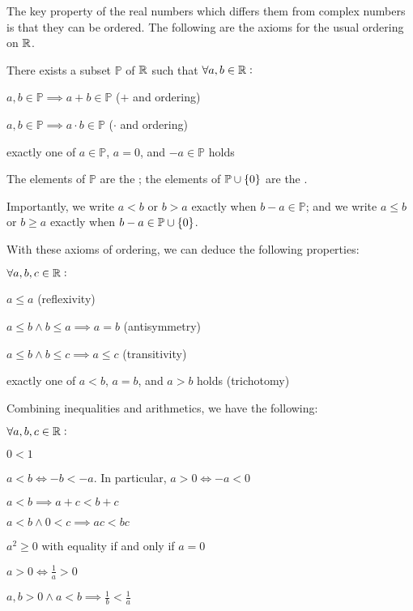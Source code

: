 \documentclass{styles/tufte}
\begin{document}
    The key property of the real numbers which differs them from complex numbers is that they can be ordered. The following are the axioms for the usual ordering on $\mathbb{R}$.
    \begin{axiom}{}{}
      There exists a subset $\mathbb{P}$ of $\mathbb{R}$ such that $\forall a, b \in \mathbb{R} :$
      \begin{romanenum}
        \item $a, b \in \mathbb{P} \implies a + b \in \mathbb{P}$ \hfill ($+$ and ordering)
        \item $a, b \in \mathbb{P} \implies a \cdot b \in \mathbb{P}$ \hfill ($\cdot$ and ordering)
        \item exactly one of $a \in \mathbb{P}$, $a = 0$, and $-a \in \mathbb{P}$ holds
      \end{romanenum}
      The elements of $\mathbb{P}$ are the ; the elements of $\mathbb{P} \cup \set{0}$ are the .
    \end{axiom}
    
    Importantly, we write $a < b$ or $b > a$ exactly when $b - a \in \mathbb{P}$; and we write $a \leqslant b$ or $b \geqslant a$ exactly when $b - a \in \mathbb{P} \cup \set{0}$.
    
    With these axioms of ordering, we can deduce the following properties:
    \begin{proposition}{}{}
      $\forall a, b, c \in \mathbb{R} :$
      \begin{romanenum}
        \item $a \leqslant a$ \hfill (reflexivity)
        \item $a \leqslant b \wedge b \leqslant a \implies a = b$ \hfill (antisymmetry)
        \item $a \leqslant b \wedge b \leqslant c \implies a \leqslant c$ \hfill (transitivity)
        \item exactly one of $a < b$, $a = b$, and $a > b$ holds \hfill (trichotomy)
      \end{romanenum}
    \end{proposition}
    
    Combining inequalities and arithmetics, we have the following:
    \begin{proposition}{}{}
      $\forall a, b, c \in \mathbb{R} :$
      \begin{romanenum}
        \item $0 < 1$
        \item $a < b \iff -b < -a$. In particular, $a > 0 \iff -a < 0$
        \item $a < b \implies a + c < b + c$
        \item $a < b \wedge 0 < c \implies ac < bc$
        \item $a^2 \geqslant 0$ with equality if and only if $a = 0$
        \item $a > 0 \iff \frac{1}{a} > 0$
        \item $a, b > 0 \wedge a < b \implies \frac{1}{b} < \frac{1}{a}$
      \end{romanenum}
    \end{proposition}
    
\end{document}
